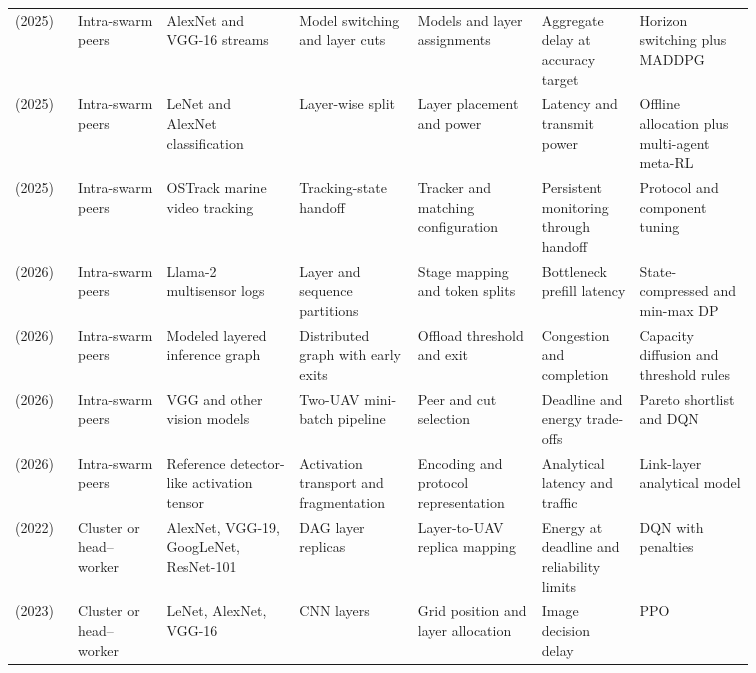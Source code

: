 \begin{table}[!tp]
\begin{tabular}{@{}Y{0.0705\linewidth}Y{0.1043\linewidth}Y{0.1589\linewidth}Y{0.1363\linewidth}Y{0.1419\linewidth}Y{0.1175\linewidth}Y{0.1307\linewidth}@{}}
\cite{R0059}\newline\mbox{(2025)} & Intra-swarm peers & AlexNet and VGG-16 streams & Model switching and layer cuts & Models and layer assignments & Aggregate delay at accuracy target & Horizon switching plus MADDPG \\
\cite{R0068}\newline\mbox{(2025)} & Intra-swarm peers & LeNet and AlexNet classification & Layer-wise split & Layer placement and power & Latency and transmit power & Offline allocation plus multi-agent meta-RL \\
\cite{R0292}\newline\mbox{(2025)} & Intra-swarm peers & OSTrack marine video tracking & Tracking-state handoff & Tracker and matching configuration & Persistent monitoring through handoff & Protocol and component tuning \\
\cite{R0074}\newline\mbox{(2026)} & Intra-swarm peers & Llama-2 multisensor logs & Layer and sequence partitions & Stage mapping and token splits & Bottleneck prefill latency & State-compressed and min-max DP \\
\cite{R0077}\newline\mbox{(2026)} & Intra-swarm peers & Modeled layered inference graph & Distributed graph with early exits & Offload threshold and exit & Congestion and completion & Capacity diffusion and threshold rules \\
\cite{R0092}\newline\mbox{(2026)} & Intra-swarm peers & VGG and other vision models & Two-UAV mini-batch pipeline & Peer and cut selection & Deadline and energy trade-offs & Pareto shortlist and DQN \\
\cite{R0121}\newline\mbox{(2026)} & Intra-swarm peers & Reference detector-like activation tensor & Activation transport and fragmentation & Encoding and protocol representation & Analytical latency and traffic & Link-layer analytical model \\
\cite{R0029}\newline\mbox{(2022)} & Cluster or head--worker & AlexNet, VGG-19, GoogLeNet, ResNet-101 & DAG layer replicas & Layer-to-UAV replica mapping & Energy at deadline and reliability limits & DQN with penalties \\
\cite{R0019}\newline\mbox{(2023)} & Cluster or head--worker & LeNet, AlexNet, VGG-16 & CNN layers & Grid position and layer allocation & Image decision delay & PPO \\

\end{tabular}
\end{table}
